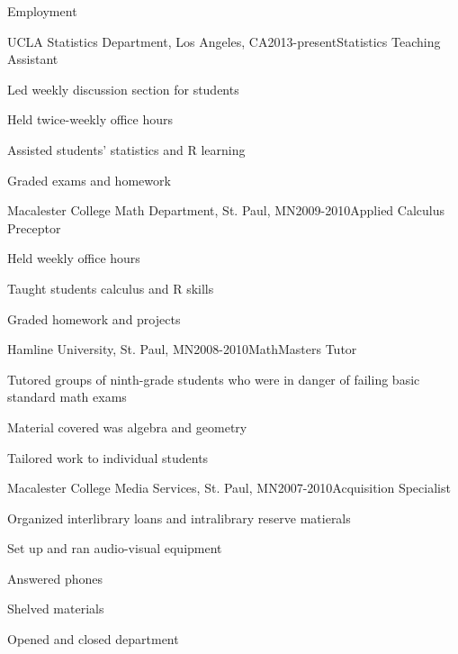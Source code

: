 \documentclass{resume} %
\begin{document}
\clearpage
\begin{rSection}{Employment}

\begin{rSubsection}{UCLA Statistics Department, }{Los Angeles, CA}{2013-present}{Statistics Teaching Assistant}
\item Led weekly discussion section for students
\item Held twice-weekly office hours
\item Assisted students' statistics and R learning
\item Graded exams and homework
\end{rSubsection}

\begin{rSubsection}{Macalester College Math Department, }{St. Paul, MN}{2009-2010}{Applied Calculus Preceptor}
\item Held weekly office hours
\item Taught students calculus and R skills
\item Graded homework and projects
\end{rSubsection}

\begin{rSubsection}{Hamline University, }{St. Paul, MN}{2008-2010}{MathMasters Tutor}
\item Tutored groups of ninth-grade students who were in danger of failing basic standard math exams
\item Material covered was algebra and geometry
\item Tailored work to individual students
\end{rSubsection}

\begin{rSubsection}{Macalester College Media Services, }{St. Paul, MN}{2007-2010}{Acquisition Specialist}
\item Organized interlibrary loans and intralibrary reserve matierals
\item Set up and ran audio-visual equipment
\item Answered phones
\item Shelved materials
\item Opened and closed department
\end{rSubsection}
\end{rSection}
\end{document}
